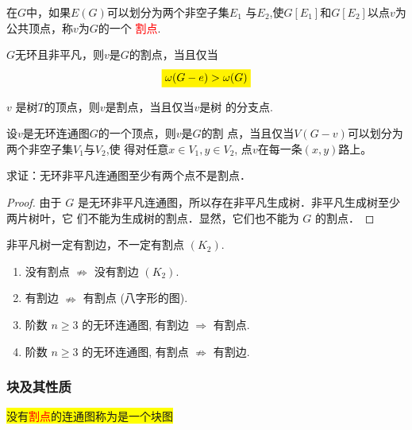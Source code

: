 \begin{definition}
在$G$中，如果$E(G)$可以划分为两个非空子集$E_1$
与$E_2$,使$G[E_1]$和$G[E_2]$以点$v$为公共顶点，称$v$为$G$的一个
\textcolor{red}{割点}.
\end{definition}
\begin{theorem}
$G$无环且非平凡，则$v$是$G$的割点，当且仅当
\[
\colorbox{yellow}{$\omega(G-e)>\omega(G)$}
\]
\end{theorem}

\begin{theorem}
$v$ 是树$T$的顶点，则$v$是割点，当且仅当$v$是树
的分支点.
\end{theorem}

\begin{theorem}
设$v$是无环连通图$G$的一个顶点，则$v$是$G$的割
点，当且仅当$V(G-v)$可以划分为两个非空子集$V_1$与$V_2$,使
得对任意$x \in V_1, y \in V_2$, 点$v$在每一条$(x,y)$路上。
\end{theorem}

\begin{example}
	求证：无环非平凡连通图至少有两个点不是割点．
\end{example}
\begin{proof}
	由于 $G$ 是无环非平凡连通图，所以存在非平凡生成树．非平凡生成树至少两片树叶，它
	们不能为生成树的割点．显然，它们也不能为 $G$ 的割点．
\end{proof}
\begin{note}
	非平凡树一定有割边，不一定有割点 $(K_2)$.
\end{note}
\begin{theorem}[割点与割边关系]
	\begin{enumerate}
		\item 没有割点 \( \nRightarrow \) 没有割边 \( \left(K_{2}\right) \).
		\item 有割边 \( \nRightarrow \) 有割点 (八字形的图).
	\item 阶数 \(n \geq 3 \) 的无环连通图, 有割边 \( \Rightarrow \) 有割点.
		\item 阶数 \( n\geq 3 \) 的无环连通图, 有割点 \( \nRightarrow  \) 有割边.
	\end{enumerate}
\end{theorem}




\subsubsection{块及其性质}
\begin{definition}
\colorbox{yellow}{没有\textcolor{red}{割点}的连通图称为是一个块图}
\end{definition}

